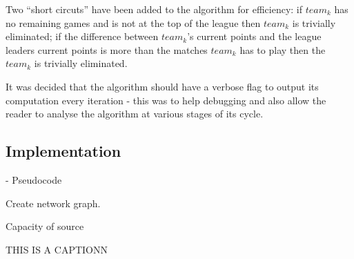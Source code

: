 Two ``short circuts'' have been added to the algorithm for efficiency:
if $team_k$ has no remaining games and is not at the top of the league
then $team_k$ is trivially eliminated; if the difference between
$team_k$'s current points and the league leaders current points is
more than the matches $team_k$ has to play then the $team_k$ is
trivially eliminated.

It was decided that the algorithm should have a verbose flag to output
its computation every iteration - this was to help debugging and also
allow the reader to analyse the algorithm at various stages of its
cycle. 

\subsection{Implementation}

- Pseudocode



\begin{algorithm}[H]
                               
  \SetAlgoLined
  
  
  
  Create network graph.
  
  Capacity of source 
  
  \caption{THIS IS A CAPTIONN}
\end{algorithm}